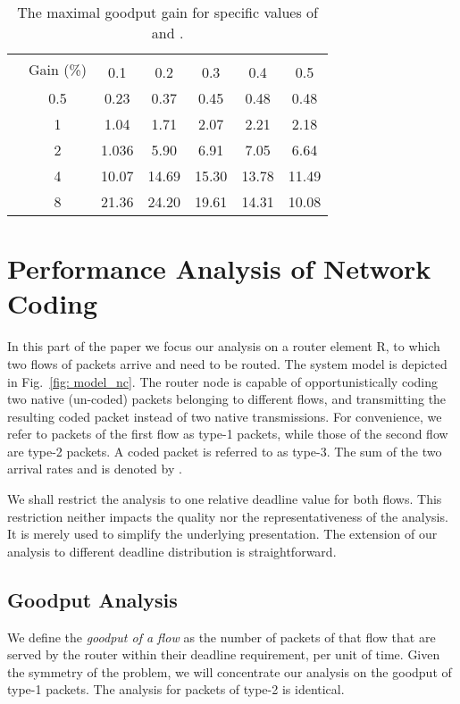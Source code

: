 \documentclass[preprint,12pt]{elsarticle}
\theoremstyle{definition}
\theoremstyle{plain}
\theoremstyle{remark}
\begin{document}
\begin{table}[t]
\centering
\begin{tabular}{|cc|ccccc|}
\hline
&\multirow{2}{*}{Gain (\%)}& \multicolumn{5}{c|}{}\\
  && 0.1 & 0.2 & 0.3 & 0.4 & 0.5 \\
  \hline
  \multirow{5}{*}{}
 &0.5 & 0.23 & 0.37 & 0.45 & 0.48 & 0.48 \\
 & 1 & 1.04 & 1.71 & 2.07 & 2.21 & 2.18 \\
 & 2  & 1.036 & 5.90 & 6.91 & 7.05 & 6.64 \\
 & 4 & 10.07 & 14.69 & 15.30 & 13.78 & 11.49 \\
 & 8 & 21.36 & 24.20 & 19.61 & 14.31 & 10.08 \\
 \hline
\end{tabular}
\caption{The maximal goodput gain for specific values of  and .}
\label{tab: maximal gain values}
\end{table}

\section{Performance Analysis of Network Coding} \label{section:performanceAnalysisNetworkCoding}
In this part of the paper we focus our analysis on a router element R, to which two flows of packets arrive and need to be routed. The system model is depicted in Fig.~\ref{fig: model_nc}. The router node is capable of opportunistically coding two native (un-coded) packets belonging to different flows, and transmitting the resulting coded packet instead of two native transmissions. For convenience, we refer to packets of the first flow as type-1 packets, while those of the second flow are type-2 packets. A coded packet is referred to as type-3. The sum of the two arrival rates  and  is denoted by .

We shall restrict the analysis to one relative deadline  value for both flows. This restriction neither impacts the quality nor the representativeness of the analysis. It is merely used to simplify the underlying presentation. The extension of our analysis to different deadline distribution is straightforward.

\subsection{Goodput Analysis}
We define the \textit{goodput of a flow} as the number of packets of that flow that are served by the router within their deadline requirement, per unit of time. Given the symmetry of the problem, we will concentrate our analysis on the goodput of type-1 packets. The analysis for packets of type-2 is identical.
\end{document}
